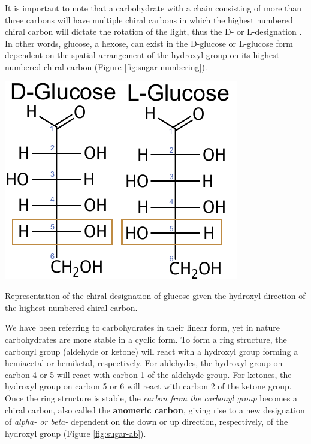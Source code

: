 \documentclass{tufte-handout}
\begin{document}
It is important to note that a carbohydrate with a chain consisting of more than three carbons will have multiple chiral carbons in which the highest numbered chiral carbon will dictate the rotation of the light, thus the D- or L-designation . In other words, glucose, a hexose, can exist in the D-glucose or L-glucose form dependent on the spatial arrangement of the hydroxyl group on its highest numbered chiral carbon (Figure \ref{fig:sugar-numbering}).

\begin{marginfigure}
\includegraphics{figures/Glucose-DL.pdf}
\caption{Representation of the chiral designation of glucose given the hydroxyl direction of the highest numbered chiral carbon.}
\label{fig:sugar-numbering}
\end{marginfigure}

 We have been referring to carbohydrates in their linear form, yet in nature carbohydrates are more stable in a cyclic form. To form a ring structure, the carbonyl group (aldehyde or ketone) will react with a hydroxyl group forming a hemiacetal or hemiketal, respectively. For aldehydes, the hydroxyl group on carbon 4 or 5 will react with carbon 1 of the aldehyde group. For ketones, the hydroxyl group on carbon 5 or 6 will react with carbon 2 of the ketone group. Once the ring structure is stable, the \emph{carbon from the carbonyl group} becomes a chiral
carbon, also called the \textbf{anomeric carbon}, giving rise to a new designation of \emph{alpha- or beta-} dependent on the down or up direction, respectively, of the hydroxyl group (Figure \ref{fig:sugar-ab}).
\end{document}
